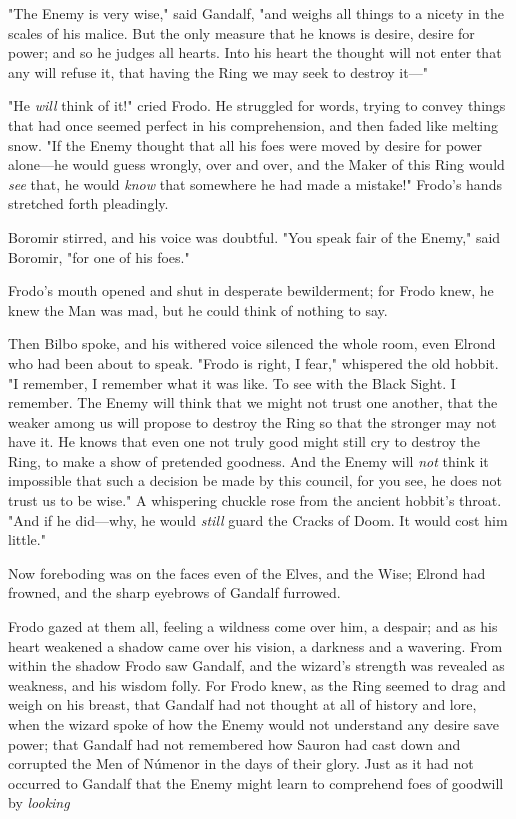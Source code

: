 "The Enemy is very wise," said Gandalf, "and weighs all things to a nicety in
the scales of his malice. But the only measure that he knows is desire, desire
for power; and so he judges all hearts. Into his heart the thought will not
enter that any will refuse it, that having the Ring we may seek to destroy
it—"

"He \emph{will} think of it!" cried Frodo. He struggled for words, trying to
convey things that had once seemed perfect in his comprehension, and then faded
like melting snow. "If the Enemy thought that all his foes were moved by desire
for power alone—he would guess wrongly, over and over, and the Maker of this
Ring would \emph{see} that, he would \emph{know} that somewhere he had made a
mistake!" Frodo's hands stretched forth pleadingly.

Boromir stirred, and his voice was doubtful. "You speak fair of the Enemy,"
said Boromir, "for one of his foes."

Frodo's mouth opened and shut in desperate bewilderment; for Frodo knew, he
knew the Man was mad, but he could think of nothing to say.

Then Bilbo spoke, and his withered voice silenced the whole room, even Elrond
who had been about to speak. "Frodo is right, I fear," whispered the old
hobbit. "I remember, I remember what it was like. To see with the Black Sight.
I remember. The Enemy will think that we might not trust one another, that the
weaker among us will propose to destroy the Ring so that the stronger may not
have it. He knows that even one not truly good might still cry to destroy the
Ring, to make a show of pretended goodness. And the Enemy will \emph{not} think
it impossible that such a decision be made by this council, for you see, he
does not trust us to be wise." A whispering chuckle rose from the ancient
hobbit's throat. "And if he did—why, he would \emph{still} guard the Cracks
of Doom. It would cost him little."

Now foreboding was on the faces even of the Elves, and the Wise; Elrond had
frowned, and the sharp eyebrows of Gandalf furrowed.

Frodo gazed at them all, feeling a wildness come over him, a despair; and as
his heart weakened a shadow came over his vision, a darkness and a wavering.
From within the shadow Frodo saw Gandalf, and the wizard's strength was
revealed as weakness, and his wisdom folly. For Frodo knew, as the Ring seemed
to drag and weigh on his breast, that Gandalf had not thought at all of history
and lore, when the wizard spoke of how the Enemy would not understand any
desire save power; that Gandalf had not remembered how Sauron had cast down and
corrupted the Men of Númenor in the days of their glory. Just as it had not
occurred to Gandalf that the Enemy might learn to comprehend foes of goodwill
by \emph{looking{\el}}

